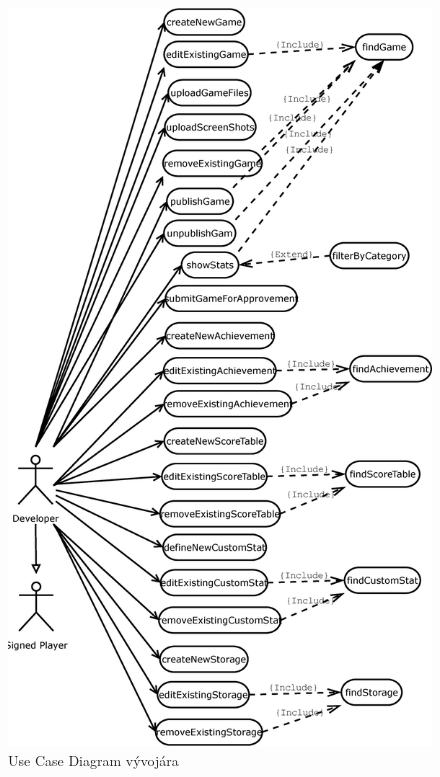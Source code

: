 \begin{figure}[h]
  \centering
  \includegraphics[scale=0.4]{fig/ucd-vyvojar.eps}
  \caption{Use Case Diagram vývojára}
  \label{fig:ucdvyvojar}
\end{figure}

